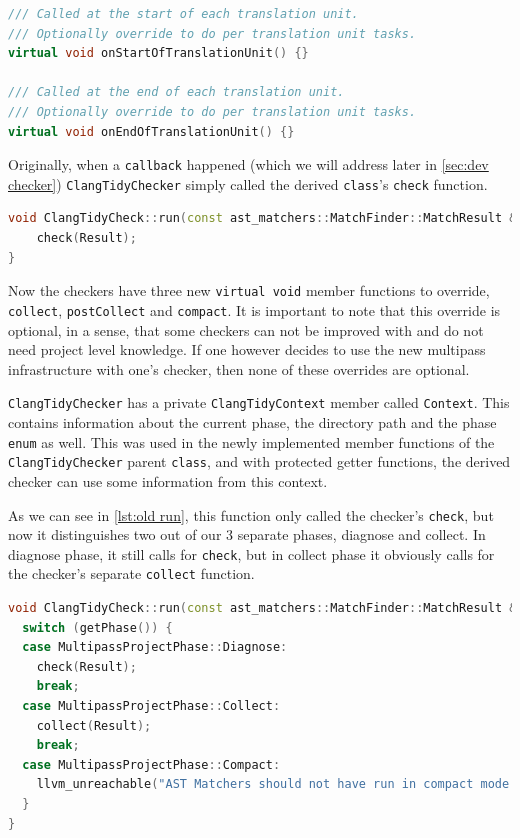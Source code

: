 \begin{lstlisting}[language={C++},caption={Virtual functions from MatchCallback's header.},label={lst:mc single virtual}]
/// Called at the start of each translation unit.
/// Optionally override to do per translation unit tasks.
virtual void onStartOfTranslationUnit() {}

/// Called at the end of each translation unit.
/// Optionally override to do per translation unit tasks.
virtual void onEndOfTranslationUnit() {}
\end{lstlisting}

Originally, when a \texttt{callback} happened (which we will address later in \cref{sec:dev checker})
\texttt{ClangTidyChecker} simply called the derived \lstinline{class}'s \texttt{check} function.

\begin{lstlisting}[language={C++},caption={The old infrastructure's way of calling check.},label={lst:old run}]
void ClangTidyCheck::run(const ast_matchers::MatchFinder::MatchResult &Result) {
	check(Result);
}
\end{lstlisting}

Now the checkers have three new \lstinline{virtual void} member functions to override, \texttt{collect}, \texttt{postCollect}
and \texttt{compact}.
It is important to note that this override is optional, in a sense, that some checkers can not be improved with and do not need
project level knowledge. If one however decides to use the new multipass infrastructure with one's checker, then none of these overrides
are optional.
 
\texttt{ClangTidyChecker} has a private \texttt{ClangTidyContext} member called \texttt{Context}.
This contains information about the current phase, the directory path and the
phase \lstinline{enum} as well. This was used in the newly implemented member functions of the \texttt{ClangTidyChecker}
parent \lstinline{class}, and with protected getter functions, the derived checker can use some information from this context.


As we can see in \cref{lst:old run}, this function only called the checker's \texttt{check}, but now it distinguishes two
out of our 3 separate
phases, diagnose and collect. In diagnose phase, it still calls for \texttt{check}, but in collect phase it obviously calls
for the checker's separate \texttt{collect} function.

\begin{lstlisting}[language={C++},caption={Run function distinguishing Diagnose and Collect phase.},label={lst:new run}]
void ClangTidyCheck::run(const ast_matchers::MatchFinder::MatchResult &Result) {
  switch (getPhase()) {
  case MultipassProjectPhase::Diagnose:
    check(Result);
    break;
  case MultipassProjectPhase::Collect:
    collect(Result);
    break;
  case MultipassProjectPhase::Compact:
    llvm_unreachable("AST Matchers should not have run in compact mode.");
  }
}
\end{lstlisting}

